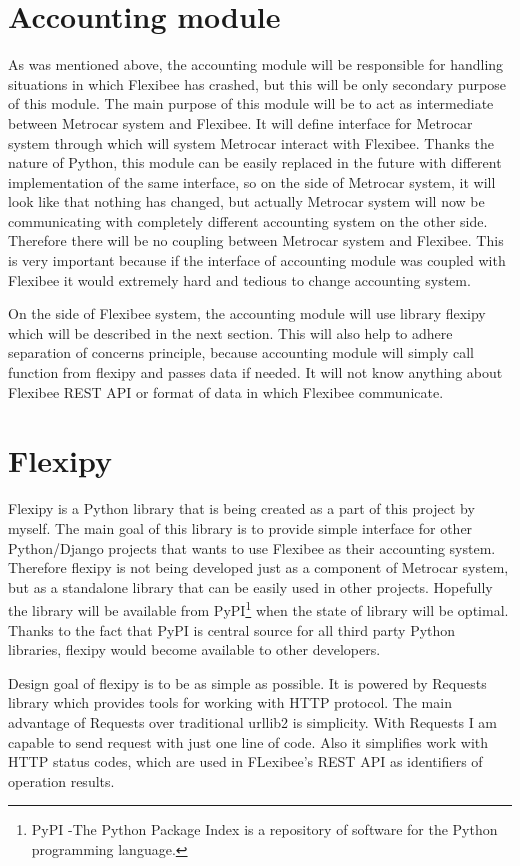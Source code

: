 \documentclass[11pt,twoside,a4paper]{book}
\begin{document}
\section{Accounting module}
As was mentioned above, the accounting module will be responsible for handling situations in which Flexibee has crashed, but this will be only secondary purpose of this module. The main purpose of this module will be to act as intermediate between Metrocar system and Flexibee. It will define interface for Metrocar system through which will system Metrocar interact with Flexibee. Thanks the nature of Python, this module can be easily replaced in the future with different implementation of the same interface, so on the side of Metrocar system, it will look like that nothing has changed, but actually Metrocar system will now be communicating with completely different accounting system on the other side. Therefore there will be no coupling between Metrocar system and Flexibee. This is very important because if the interface of accounting module was coupled with Flexibee it would extremely hard and tedious to change accounting system. 

On the side of Flexibee system, the accounting module will use library flexipy which will be described in the next section. This will also help to adhere separation of concerns principle\cite{wiki:soc}, because accounting module will simply call function from flexipy and passes data if needed. It will not know anything about Flexibee REST API or format of data in which Flexibee communicate.  

\section{Flexipy}
Flexipy is a Python library that is being created as a part of this project by myself. The main goal of this library is to provide simple interface for other Python/Django projects that wants to use Flexibee as their accounting system. Therefore flexipy is not being developed just as a component of Metrocar system, but as a standalone library that can be easily used in other projects. Hopefully the library will be available from PyPI\footnote{PyPI -The Python Package Index is a repository of software for the Python programming language.} when the state of library will be optimal. Thanks to the fact that PyPI is central source for all third party Python libraries, flexipy would become available to other developers. 

Design goal of flexipy is to be as simple as possible. It is powered by Requests library\cite{requests} which provides tools for working with HTTP protocol. The main advantage of Requests over traditional urllib2 is simplicity. With Requests I am capable to send request with just one line of code. Also it simplifies work with HTTP status codes, which are used in FLexibee's REST API as identifiers of operation results.
\end{document}
